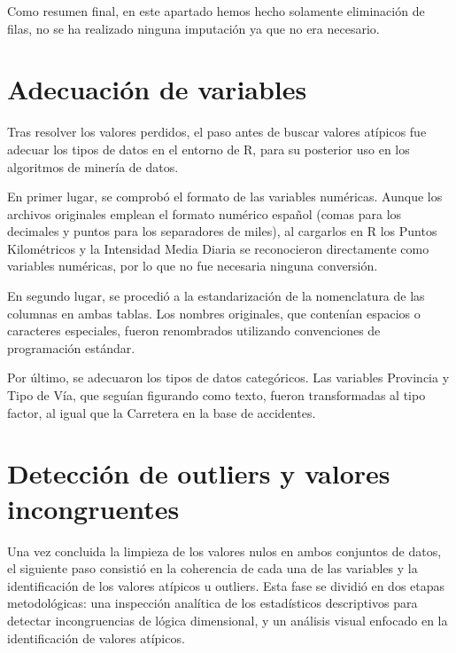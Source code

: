 \documentclass[twoside,a4paper,12pt,onecolumn,openany]{book}
\begin{document}
\vspace{0.5cm}

Como resumen final, en este apartado hemos hecho solamente eliminación de filas, no se ha realizado ninguna imputación ya que no era necesario. 

\section{Adecuación de variables}

Tras resolver los valores perdidos, el paso antes de buscar valores atípicos fue adecuar los tipos de datos en el entorno de R, para su posterior uso en los algoritmos de minería de datos.

\vspace{0.5cm}

En primer lugar, se comprobó el formato de las variables numéricas. Aunque los archivos originales emplean el formato numérico español (comas para los decimales y puntos para los separadores de miles), al cargarlos en R los Puntos Kilométricos y la Intensidad Media Diaria se reconocieron directamente como variables numéricas, por lo que no fue necesaria ninguna conversión.

\vspace{0.5cm}

En segundo lugar, se procedió a la estandarización de la nomenclatura de las columnas en ambas tablas. Los nombres originales, que contenían espacios o caracteres especiales, fueron renombrados utilizando convenciones de programación estándar. 

\vspace{0.5cm}

Por último, se adecuaron los tipos de datos categóricos. Las variables Provincia y Tipo de Vía, que seguían figurando como texto, fueron transformadas al tipo factor, al igual que la Carretera en la base de accidentes.

\section{Detección de outliers y valores incongruentes}

Una vez concluida la limpieza de los valores nulos en ambos conjuntos de datos, el siguiente paso consistió en la coherencia de cada una de las variables y la identificación de los valores atípicos u outliers. Esta fase se dividió en dos etapas metodológicas: una inspección analítica de los estadísticos descriptivos para detectar incongruencias de lógica dimensional, y un análisis visual enfocado en la identificación de valores atípicos.
\end{document}
